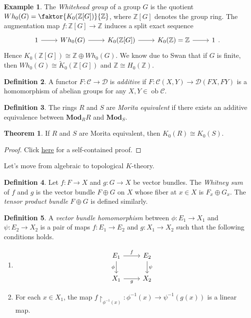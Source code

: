 \documentclass[10pt,letterpaper,cm]{nupset}
\theoremstyle{definition}
\newtheorem{definition}{Definition}
\newtheorem{exmp}[definition]{Example}
\theoremstyle{theorem}
\newtheorem{theorem}{Theorem}
\theoremstyle{remark}
\newcommand{\Z}{\mathbb Z}
\newcommand{\1}{\mathbf{1}}
\renewcommand{\c}{\mathscr{C}}
\renewcommand{\d}{\mathscr{D}}
\newcommand{\0}{\vec 0}
\DeclareMathOperator{\ob}{ob}
\begin{document}
\begin{exmp}
The \textit{Whitehead group} of a group $G$ is the quotient $Wh_0(G) =\faktor{K_0(\Z[G])}{\Z}$, where $\Z[G]$ denotes the group ring. The augmentation map $f: \Z[G] \to \Z$ induces a split exact sequence 
\[
\begin{tikzcd}
1 \arrow[r] & Wh_0(G) \arrow[r] & K_0(\Z[G]) \arrow[r] & K_0(\Z) =\mathbb Z \arrow[r] & 1
\end{tikzcd}.
\]
 Hence $K_0(\Z[G]) \cong \Z \oplus Wh_0(G)$. We know due to Swan that if $G$ is finite, then $Wh_0(G) \cong \widetilde{K}_0(\Z[G])$  and $\Z \cong H_0(\Z)$. 
\end{exmp}

\begin{definition}
A functor $F: \c \to \d$ is \textit{additive} if $F: \c(X, Y) \to \d(FX, FY)$ is a homomorphism of abelian groups for any $X, Y \in \ob \c$.
\end{definition}

\begin{definition}
The rings $R$ and $S$ are \textit{Morita equivalent} if there exists an additive equivalence between $\mathbf{Mod}_R$$R$ and $\mathbf{Mod}_S$. 
\end{definition}

\begin{theorem}
If $R$ and $S$ are Morita equivalent, then $K_0(R) \cong K_0(S)$.
\end{theorem}
\begin{proof}
Click \href{http://www.staff.science.uu.nl/~henri105/Seminars/AlgKthy2011Talk3.pdf}{here} for a self-contained proof.
\end{proof}

Let's move from algebraic to topological $K$-theory.

\begin{definition}
Let $f: F \to X$ and $g: G \to X$ be vector bundles. The \textit{Whitney sum} of $f$ and $g$ is the vector bundle $F \oplus G$ on $X$ whose fiber at $x \in X$ is $F_x \oplus G_x$.  The \textit{tensor product bundle} $F \oplus G$ is defined similarly.
\end{definition}

\begin{definition}
A \textit{vector bundle homomorphism} between $\phi : E_1 \to X_1$ and $\psi : E_2 \to X_2$ is a pair of maps $f: E_1 \to E_2$ and $g: X_1 \to X_2$ such that the following conditions holds.
\begin{enumerate}
\item 
\[
\begin{tikzcd}
E_1 \arrow[r, "f"] \arrow[d, "\phi"'] & E_2 \arrow[d, "\psi"] \\
X_1 \arrow[r, "g"'] & X_2
\end{tikzcd}
\]
\item For each $x \in X_1$, the map $f \restriction_{\phi^{-1}(x)} : \phi^{-1}(x) \to \psi^{-1}(g(x))$ is a linear map.
\end{enumerate}
\end{definition}
\end{document}
